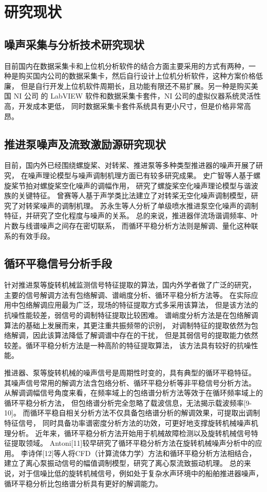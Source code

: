 \section{研究现状}
\subsection{噪声采集与分析技术研究现状}
目前国内在数据采集卡和上位机分析软件的结合方面主要采用的方式有两种，一
种是购买国内公司的数据采集卡，然后自行设计上位机分析软件，这种方案价格低廉，
但是自行开发上位机软件周期长，且功能有限还不易扩展。另一种是购买美国 NI 公司
的 LabVIEW 软件和数据采集卡套件，NI 公司的虚拟仪器系统灵活性高，开发成本更低，
同时数据采集卡套件系统具有更小尺寸，但是价格非常高昂。
\subsection{推进泵噪声及流致激励源研究现状}
目前，国内外已经围绕螺旋桨、对转桨、推进泵等多种类型推进器的噪声开展了研究，
在噪声理论模型与噪声调制机理方面已有较多研究成果。
史广智等人基于螺旋桨节拍对螺旋桨空化噪声的调幅作用，
研究了螺旋桨空化噪声理论模型与谐波族的关键特征。
曾赛等人基于声学类比法建立了对转桨无空化噪声调制模型，研究了对转桨噪声的调制机理。
苏永生等人分析了单级喷水推进泵空化噪声的调制特征，并研究了空化程度与噪声的关系。
总的来说，推进器伴流场谐调频率、叶片数与线谱噪声之间存在密切联系，
而循环平稳分析方法则是解调、量化这种联系的有效手段。

\subsection{循环平稳信号分析手段}
针对推进泵等旋转机械监测信号特征提取的算法，国内外学者做了广泛的研究，
主要的信号解调方法有包络解调、谱峭度分析、循环平稳分析方法等。
在实际应用中包络解调应用最为广泛，现场的特征提取方式多采用该算法，
但是该方法的抗噪性能较差，弱信号的调制特征提取比较困难。
谱峭度分析方法是在包络解调算法的基础上发展而来，其更注重共振频带的识别，
对调制特征的提取依然为包络解调，因此该算法降低了解调谱中存在的干扰，
但是其弱信号的提取能力依然较差。循环平稳分析方法是一种高阶的特征提取算法，
该方法具有较好的抗噪性能。

推进器、泵等旋转机械的噪声信号是周期性时变的，具有典型的循环平稳特征。
其噪声信号常用的解调方法含包络分析、循环平稳分析等非平稳信号分析方法。
从解调调幅信号角度来看，在频率域上的包络谱分析方法等效于在循环频率域上的循环平稳分析方法，
但包络谱分析完全忽略了载波信息，无法揭示载波频率[9-10]。
而循环平稳自相关分析方法不仅具备包络谱分析的解调效果，可提取出调制特征信号，
同时具备功率谱密度分析方法的功效，可更好地支撑旋转机械噪声机理分析。
近年来，循环平稳分析方法开始用于机械故障检测以及旋转机械信号特征提取领域。
Antoni[11]较早研究了循环平稳分析方法在旋转机械噪声分析中的应用。
李诗佯[12]等人将CFD（计算流体力学）方法和循环平稳分析方法相结合，
建立了离心泵振动信号的幅值调制模型，研究了离心泵流致振动机理。
总的来说，对于信噪比低的旋转机械信号，例如处于复杂水声环境中的船舶推进器噪声，
循环平稳分析比包络谱分析具有更好的解调能力。

